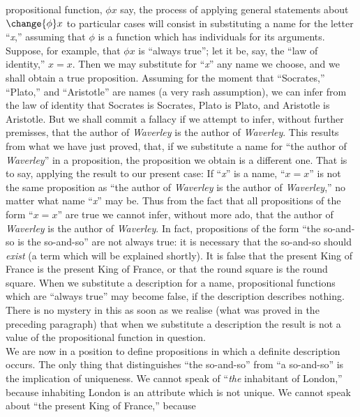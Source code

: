 {propositional
function,
$\phi x$ say, the
process of applying general statements about \label{change:missingphi175}$\change{\phi} x$ to
particular cases will consist in substituting a name for the letter ``\textit{x},''
assuming that $\phi$
is a function which has individuals for its arguments.
Suppose, for example, that $\phi x$ is ``always true'';
let it
be, say, the ``law of identity,'' $x=x$. Then we may
substitute for ``\textit{x}''
any name we choose, and we shall obtain a true proposition. Assuming
for the moment that ``Socrates,'' ``Plato,'' and ``Aristotle'' are names (a
very rash assumption), we can infer from the law of identity that
Socrates is Socrates, Plato is Plato, and Aristotle is Aristotle. But
we shall commit a fallacy if we attempt to infer, without further
premisses, that the author of \textit{Waverley}
is the author of \textit{Waverley}.
This
results   from what
we have just proved, that, if we substitute a name
for ``the author of \textit{Waverley}''
in a proposition, the proposition we
obtain is a different one. That is to say, applying the result to our
present case: If ``\textit{x}''
is a name, ``$x=x$'' is not the same
proposition as
``the author of \textit{Waverley}
is the author of \textit{Waverley},''
no matter what name
``\textit{x}'' may be.
Thus from the fact that all propositions of the form ``$x=x$''
are true we cannot infer, without more ado, that the author of \textit{Waverley}
is the author of \textit{Waverley}.
In fact, propositions of the form ``the
so-and-so is the so-and-so'' are not always true: it is necessary that
the so-and-so should \textit{exist}
(a term which will be explained shortly). It is false that the present
King of
France is the present
King of
France, or that the round square is the round square. When we
substitute a description for a name, propositional functions which are
``always true'' may become false, if the description describes nothing.
There is no mystery in this as soon as we realise (what was proved in
the preceding paragraph) that when we substitute a description the
result is not a value of the propositional function in question.\\
\indent We are now in a position to define
propositions in which a
definite
description occurs. The only thing that distinguishes ``the so-and-so''
from ``a so-and-so'' is the implication of uniqueness. We cannot speak of
``\textit{the}
inhabitant of London,'' because inhabiting London is an attribute
which is not unique. We cannot speak about ``the present King
of France,'' because
}
